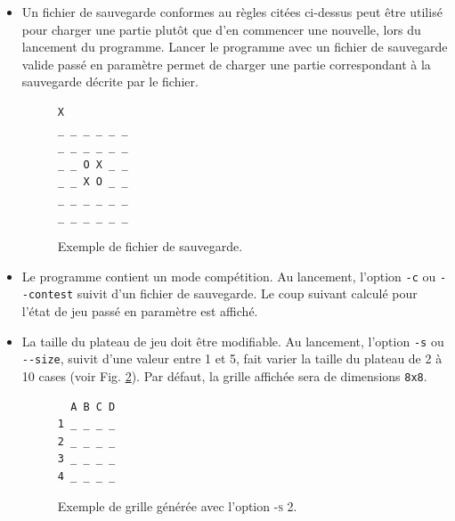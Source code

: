 \documentclass[10pt,a4paper]{article}
\begin{document}
\begin{itemize}
\item Un fichier de sauvegarde conformes au règles citées ci-dessus peut être utilisé pour charger une partie plutôt que d'en commencer une nouvelle, lors du lancement du programme.  Lancer le programme avec un fichier de sauvegarde valide passé en paramètre permet de charger une partie correspondant à la sauvegarde décrite par le fichier.
\begin{figure}[H]    
\centering
\begin{BVerbatim}
X
_ _ _ _ _ _
_ _ _ _ _ _
_ _ O X _ _
_ _ X O _ _
_ _ _ _ _ _
_ _ _ _ _ _ 
\end{BVerbatim}
\caption {Exemple de fichier de sauvegarde.\label{fig:exemple_save}}
\end{figure}

\item Le programme contient un mode compétition. Au lancement, l'option \verb!-c! ou \verb!--contest! suivit d'un fichier de sauvegarde. Le coup suivant calculé pour l'état de jeu passé en paramètre est affiché.
\item La taille du plateau de jeu doit être modifiable. Au lancement, l'option \verb!-s! ou \verb!--size!, suivit d'une valeur entre 1 et 5, fait varier la taille du plateau de 2 à 10 cases (voir Fig. \ref{fig:exemple_taille}). Par défaut, la grille affichée sera de dimensions
\verb!8x8!.

\begin{figure}[H]    
\centering
\begin{BVerbatim}
  A B C D
1 _ _ _ _
2 _ _ _ _
3 _ _ _ _
4 _ _ _ _    
\end{BVerbatim}
\caption {Exemple de grille générée avec l'option \textsc{-s 2}.\label{fig:exemple_taille}}
\end{figure}


\end{itemize}
\end{document}
